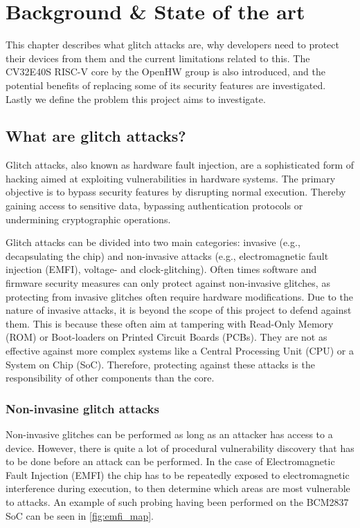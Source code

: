 \chapter{Background \& State of the art}
\label{chap3}

This chapter describes what glitch attacks are, why developers need to protect their devices from them and the current limitations related to this. The CV32E40S RISC-V core by the OpenHW group is also introduced, and the potential benefits of replacing some of its security features are investigated. Lastly we define the problem this project aims to investigate. 

\section{What are glitch attacks?}
\label{sec:glitch_attacks}

Glitch attacks, also known as hardware fault injection, are a sophisticated form of hacking aimed at exploiting vulnerabilities in hardware systems. The primary objective is to bypass security features by disrupting normal execution. Thereby gaining access to sensitive data, bypassing authentication protocols or undermining cryptographic operations. 

Glitch attacks can be divided into two main categories: invasive (e.g., decapsulating the chip\cite{intro_to_hw_hacking}) and non-invasive attacks (e.g., electromagnetic fault injection (EMFI), voltage- and clock-glitching). Often times software and firmware security measures can only protect against non-invasive glitches, as protecting from invasive glitches often require hardware modifications\cite{glitchresistor}. Due to the nature of invasive attacks, it is beyond the scope of this project to defend against them. This is because these often aim at tampering with Read-Only Memory (ROM) or Boot-loaders on Printed Circuit Boards (PCBs). They are not as effective against more complex systems like a Central Processing Unit (CPU) or a System on Chip (SoC). Therefore, protecting against these attacks is the responsibility of other components than the core.

\subsection{Non-invasine glitch attacks}
\label{sec:non_invasive}

Non-invasive glitches can be performed as long as an attacker has access to a device. However, there is quite a lot of procedural vulnerability discovery that has to be done before an attack can be performed\cite{arm_presentation_2}. In the case of Electromagnetic Fault Injection (EMFI) the chip has to be repeatedly exposed to electromagnetic interference during execution, to then determine which areas are most vulnerable to attacks\cite{emfi_injection}. An example of such probing having been performed on the BCM2837 SoC can be seen in \autoref{fig:emfi_map}\cite{emfi_injection}. 

